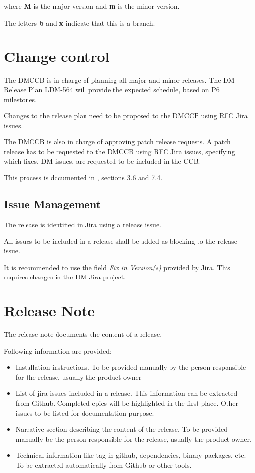 where {\bf M} is the major version and {\bf m} is the minor version.

The letters {\bf b} and {\bf x} indicate that this is a branch.

\newpage
\section{Change control} \label{sect:changecontrol}

The DMCCB is in charge of planning all major and minor releases.
The DM Release Plan LDM-564 will provide the expected schedule, based on P6 milestones.

Changes to the release plan need to be proposed to the DMCCB using RFC Jira issues.

The DMCCB is also in charge of approving patch release requests.
A patch release has to be requested to the DMCCB using RFC Jira issues, specifying which fixes, DM issues, are requested to be included in the CCB.

This process is documented in , sections 3.6 and 7.4.


\subsection{Issue Management} \label{sect:issues}

The release is identified in Jira using a release issue.

All issues to be included in a release shall be added as blocking to the release issue.

It is recommended to use the field \textit{Fix in Version(s)} provided by Jira.
This requires changes in the DM Jira project.


\newpage
\section{Release Note} \label{sect:relnote}

The release note documents the content of a release.

Following information are provided:
\begin{itemize}
\item Installation instructions. To be provided manually by the person responsible for the release, usually the product owner.
\item List of jira issues included in a release. This information can be extracted from Github. Completed epics will be highlighted in the first place. Other issues to be listed for documentation purpose.
\item Narrative section describing the content of the release. To be provided manually be the person responsible for the release, usually the product owner.
\item Technical information like tag in github, dependencies, binary packages, etc. To be extracted automatically from Github or other tools.
\end{itemize}

